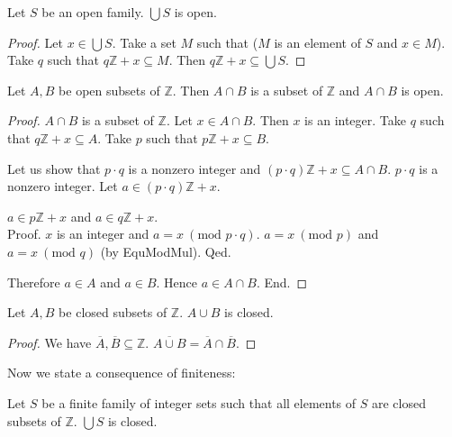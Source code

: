 \documentclass{article}
\renewcommand{\mod}{\text{mod }}
\newcommand{\Int}{\mathbb{Z}}
\begin{document}
  \begin{forthel}
    \begin{lemma}[UnionOpen]
      Let $S$ be an open family. $\bigcup S$ is open.
    \end{lemma}
    \begin{proof}
      Let $x \in \bigcup S$. Take a set $M$ such that ($M$ is an element of $S$ and $x \in M$). Take $q$ such that $q \Int + x \subseteq M$. Then $q \Int + x \subseteq \bigcup S$.
    \end{proof}

    \begin{lemma}[InterOpen]
      Let $A,B$ be open subsets of $\Int$. Then $A \cap B$ is a subset of $\Int$ and $A \cap B$ is open.
    \end{lemma}
    \begin{proof}
      $A \cap B$ is a subset of $\Int$. Let $x \in A \cap B$. Then $x$ is an integer. Take $q$ such that $q \Int + x \subseteq A$. Take $p$ such that $p \Int + x \subseteq B$.

      Let us show that $p \cdot q$ is a nonzero integer and $(p \cdot q) \Int + x \subseteq A \cap B$.
        $p \cdot q$ is a nonzero integer. Let $a \in (p \cdot q) \Int + x$.

        $a \in p \Int + x$ and $a \in q \Int + x$. \\
        Proof.
          $x$ is an integer and $a = x ~(\mod p \cdot q)$. $a = x ~(\mod p)$ and $a = x ~(\mod q)$ (by EquModMul).
        Qed.

        Therefore $a \in A$ and $a \in B$. Hence $a \in A \cap B$.
      End.
    \end{proof}

    \begin{lemma}[UnionClosed]
      Let $A,B$ be closed subsets of $\Int$. $A \cup B$ is closed.
    \end{lemma}
    \begin{proof}
      We have $\overline{A}, \overline{B} \subseteq \Int$. $\overline{A \cup B} = \overline{A} \cap \overline{B}$.
    \end{proof}
  \end{forthel}

  Now we state a consequence of finiteness:

  \begin{forthel}
    \begin{axiom}[UnionSClosed]
      Let $S$ be a finite family of integer sets such that all elements of $S$ are closed subsets of $\Int$. $\bigcup S$ is closed.
    \end{axiom}
  \end{forthel}
\end{document}
